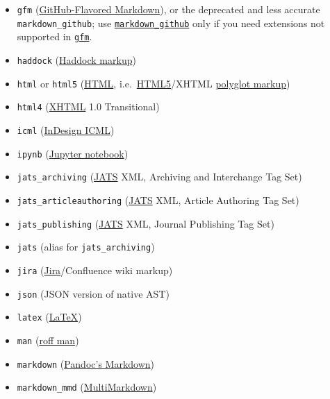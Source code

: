 \documentclass[
  b5paper
]{book}
\begin{document}
\begin{description}
\begin{itemize}
  \texttt{fb2}
  (\href{http://www.fictionbook.org/index.php/Eng:XML_Schema_Fictionbook_2.1}{FictionBook2}
  e-book)
\item
  \texttt{gfm}
  (\href{https://help.github.com/articles/github-flavored-markdown/}{GitHub-Flavored
  Markdown}), or the deprecated and less accurate
  \texttt{markdown\_github}; use
  \hyperref[markdown-variants]{\texttt{markdown\_github}} only if you
  need extensions not supported in
  \hyperref[markdown-variants]{\texttt{gfm}}.
\item
  \texttt{haddock}
  (\href{https://www.haskell.org/haddock/doc/html/ch03s08.html}{Haddock
  markup})
\item
  \texttt{html} or \texttt{html5}
  (\href{https://www.w3.org/html/}{HTML},
  i.e.~\href{https://html.spec.whatwg.org/}{HTML5}/XHTML
  \href{https://www.w3.org/TR/html-polyglot/}{polyglot markup})
\item
  \texttt{html4} (\href{https://www.w3.org/TR/xhtml1/}{XHTML} 1.0
  Transitional)
\item
  \texttt{icml}
  (\href{https://manualzz.com/doc/9627253/adobe-indesign-cs6-idml-cookbook}{InDesign
  ICML})
\item
  \texttt{ipynb}
  (\href{https://nbformat.readthedocs.io/en/latest/}{Jupyter notebook})
\item
  \texttt{jats\_archiving} (\href{https://jats.nlm.nih.gov}{JATS} XML,
  Archiving and Interchange Tag Set)
\item
  \texttt{jats\_articleauthoring} (\href{https://jats.nlm.nih.gov}{JATS}
  XML, Article Authoring Tag Set)
\item
  \texttt{jats\_publishing} (\href{https://jats.nlm.nih.gov}{JATS} XML,
  Journal Publishing Tag Set)
\item
  \texttt{jats} (alias for \texttt{jats\_archiving})
\item
  \texttt{jira}
  (\href{https://jira.atlassian.com/secure/WikiRendererHelpAction.jspa?section=all}{Jira}/Confluence
  wiki markup)
\item
  \texttt{json} (JSON version of native AST)
\item
  \texttt{latex} (\href{https://www.latex-project.org/}{LaTeX})
\item
  \texttt{man} (\href{https://man.cx/groff_man(7)}{roff man})
\item
  \texttt{markdown} (\hyperref[pandocs-markdown]{Pandoc's Markdown})
\item
  \texttt{markdown\_mmd}
  (\href{https://fletcherpenney.net/multimarkdown/}{MultiMarkdown})

\end{itemize}
\end{description}
\end{document}
